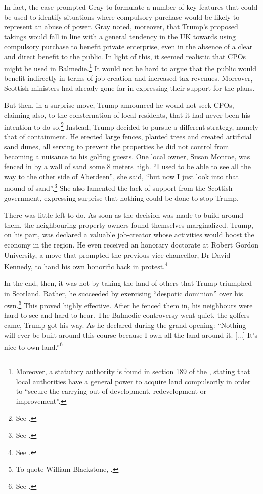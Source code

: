 In fact, the case prompted Gray to formulate a number of key features that could be used to identify situations where compulsory purchase would be likely to represent an abuse of power. Gray noted, moreover, that Trump's proposed takings would fall in line with a general tendency in the UK towards using compulsory purchase to benefit private enterprise, even in the absence of a clear and direct benefit to the public. In light of this, it seemed realistic that CPOs might be used in Balmedie.\footnote{Moreover, a statutory authority is found in section 189 of the \cite{tcpsa97}, stating that local authorities have a general power to acquire land compulsorily in order to ``secure the carrying out of development, redevelopment or improvement''.} It would not be hard to argue that the public would benefit indirectly in terms of job-creation and increased tax revenues. Moreover, Scottish ministers had already gone far in expressing their support for the plans.

But then, in a surprise move, Trump announced he would not seek CPOs, claiming also, to the consternation of local residents, that it had never been his intention to do so.\footnote{See \cite{scotsman11}.} Instead, Trump decided to pursue a different strategy, namely that of containment. He erected large fences, planted trees and created artificial sand dunes, all serving to prevent the properties he did not control from becoming a nuisance to his golfing guests. One local owner, Susan Monroe, was fenced in by a wall of sand some 8 meters high. ``I used to be able to see all the way to the other side of Aberdeen'', she said, ``but now I just look into that mound of sand''.\footnote{See \cite{booth12}.} She also lamented the lack of support from the Scottish government, expressing surprise that nothing could be done to stop Trump.

There was little left to do. As soon as the decision was made to build around them, the neighbouring property owners found themselves marginalized. Trump, on his part, was declared a valuable job-creator whose activities would boost the economy in the region. He even received an honorary doctorate at Robert Gordon University, a move that prompted the previous vice-chancellor, Dr David Kennedy, to hand his own honorific back in protest.\footnote{See \cite{bbc10b}.}

In the end, then, it was not by taking the land of others that Trump triumphed in Scotland. Rather, he succeeded by exercising ``despotic dominion'' over his own.\footnote{To quote William Blackstone, \cite[2]{blackstone79b}.} This proved highly effective. After he fenced them in, his neighbours were hard to see and hard to hear. The Balmedie controversy went quiet, the golfers came, Trump got his way. As he declared during the grand opening: ``Nothing will ever be built around this course because I own all the land around it. [...] It's nice to own land.''\footnote{See \cite{booth12}.}

